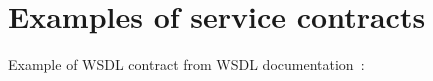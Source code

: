 \appendix
\section{Examples of service contracts}
\label{sec:appendix_service_contracts}

Example of WSDL contract from WSDL documentation~\cite{wsdl_language_spec}:
\inputminted[linenos=true]{xml}{../source/service_contract/wsdl_example.xml}
\label{lst:wsdl_example}

	
